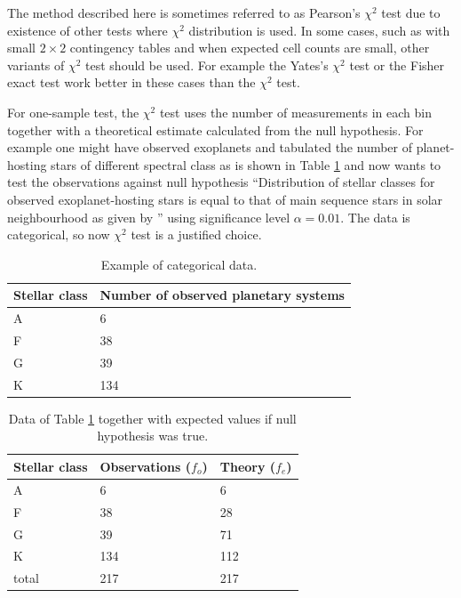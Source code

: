\documentclass[english, oneside]{HYgradu}
\begin{document}
The method described here is sometimes referred to as Pearson's $\chi^2$ test due to existence of other tests where $\chi^2$ distribution is used. In some cases, such as with small $2 \times 2$ contingency tables and when expected cell counts are small, other variants of $\chi^2$ test should be used. For example the Yates's $\chi^2$ test or the Fisher exact test work better in these cases than the $\chi^2$ test.

For one-sample test, the $\chi^2$ test uses the number of measurements in each bin together with a theoretical estimate calculated from the null hypothesis. For example one might have observed exoplanets and tabulated the number of planet-hosting stars of different spectral class as is shown in Table \ref{tab:exoplanets} and now wants 
to test the observations against null hypothesis ``Distribution of stellar classes for observed exoplanet-hosting stars is equal to that of main sequence stars in solar neighbourhood as given by \citet{ledrew2001real}'' using significance level $\alpha=0.01$. The data is categorical, so now $\chi^2$ test is a justified choice.

\begin{table}
	\centering
	\begin{tabular}{p{2cm}|p{4cm}}
		Stellar class & Number of observed planetary systems \\ \hline
		A & 6 \\
		F & 38 \\
		G & 39 \\
		K & 134
	\end{tabular}
	\caption{Example of categorical data.}
	\label{tab:exoplanets}
\end{table}

\begin{table}
	\centering
	\begin{tabular}{ l | l | l }
		Stellar class & Observations ($f_o$)& Theory ($f_e$) \\ \hline
		A & 6 & 6 \\
		F & 38 & 28 \\
		G & 39 & 71 \\
		K & 134 & 112 \\ \hline
		total & 217 & 217
	\end{tabular}
	\caption{Data of Table \ref{tab:exoplanets} together with expected values if null hypothesis was true.}
	\label{tab:exoplanets-null}
\end{table}
\end{document}
